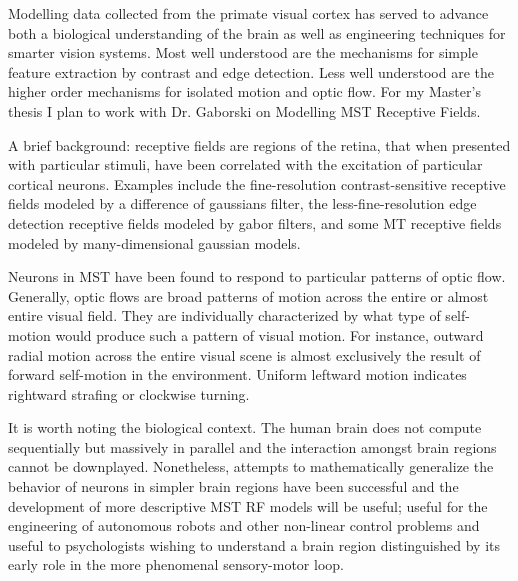 \documentclass{elsart1p}
\begin{document}
\begin{frontmatter}

\author{Ralph Bean - Thesis Pre-proposal}

\end{frontmatter}


Modelling data collected from the primate visual cortex has served to advance
both a biological understanding of the brain as well as engineering techniques
for smarter vision systems.  Most well understood are the mechanisms for simple
feature extraction by contrast and edge detection.  Less well understood are
the higher order mechanisms for isolated motion and optic flow.  For my 
Master's thesis I plan to work with Dr. Gaborski on Modelling MST 
Receptive Fields.

A brief background:  receptive fields are regions of the retina, that when
presented with particular stimuli, have been correlated with the excitation of 
particular cortical neurons.  Examples include the fine-resolution
contrast-sensitive receptive fields modeled by a difference of gaussians
filter, the less-fine-resolution edge detection receptive fields modeled by
gabor filters, and some MT receptive fields modeled by many-dimensional
gaussian models.

Neurons in MST have been found to respond to particular patterns of optic
flow.  Generally, optic flows are broad patterns of motion across the entire
or almost entire visual field.  They are individually characterized
by what type of self-motion would produce such a pattern of visual motion.  For
instance, outward radial motion across the entire visual scene is almost
exclusively the result of forward self-motion in the environment.  Uniform
leftward motion indicates rightward strafing or clockwise turning.  

It is worth noting the biological context.
The human brain does not compute sequentially but massively in parallel and
the interaction amongst brain regions cannot be downplayed.  Nonetheless, 
attempts to mathematically generalize the behavior of neurons in simpler 
brain regions have been successful and the development of more descriptive MST 
RF models will be useful; useful for the engineering
of autonomous robots and other non-linear control problems and 
useful to psychologists wishing to understand a brain region distinguished 
by its early role in the more phenomenal sensory-motor loop.
\end{document}

